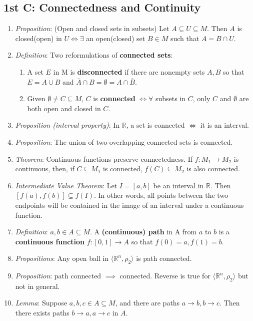 \documentclass[10pt]{article}
\newcommand{\real}{\mathbb{R}}
\begin{document}
\begin{multicols*}{3}
	\section{1st C: Connectedness and Continuity}
	\begin{enumerate}
		\item \emph{Proposition}: (Open and closed sets in subsets) Let
		$A\subseteq U\subseteq M$. Then $A$ is closed(open) in $U\iff\exists$ an
		open(closed) set $B\in M$ such that $A = B\cap U$.
		\item \emph{Definition}: Two reformulations of \textbf{connected sets}:
			\begin{enumerate}
				\item A set \(E\) in M is \textbf{disconnected} if there are nonempty
					sets \(A,B\) so that \(E=A\cup B\) and
					\(\overline{A}\cap B=\emptyset=A\cap\overline{B}\).
				\item Given $\emptyset\neq C\subseteq M$, $C$ is \textbf{connected}
					$\iff\forall$ subsets in $C$, only $C$ and $\emptyset$ are both open
					and closed in $C$.
			\end{enumerate}
		\item \emph{Proposition (interval property)}: In \(\mathbb{R}\), a set is
			connected \(\iff\) it is an interval.
		\item \emph{Proposition}: The union of two overlapping connected sets is
			connected.
			\item \emph{Theorem}: Continuous functions preserve connectedness.
			If $f:M_{1}\to M_{2}$ is continuous, then, if $C\subseteq M_{1}$ is
			connected, $f(C)\subseteq M_{2}$ is also connected.
		\item \emph{Intermediate Value Theorem}: Let $I=[a,b]$ be an interval in
			$\real$. Then $[f(a),f(b)]\subseteq f(I)$. In other words, all points
			between the two endpoints will be contained in the image of an interval
			under a continuous function.
			\item \emph{Definition}: $a,b\in A\subseteq M$. A \textbf{(continuous)
				path} in A from $a$ to $b$ is a \textbf{continuous function}
			$f:[0,1]\to A$ so that $f(0)=a, f(1)=b$.
			\item \emph{Propositions}: Any open ball in
			$\langle\real^{n},\rho_{2}\rangle$ is path connected.
			\item \emph{Proposition}: path connected $\implies$ connected. Reverse is
			true for $\langle\real^{n},\rho_{2}\rangle$ but not in general.
			\item \emph{Lemma}: Suppose $a,b,c\in A\subseteq M$, and there are paths
			$a\to b, b\to c$. Then there exists paths $b\to a, a\to c$ in $A$.
	\end{enumerate}


\end{multicols*}
\end{document}
